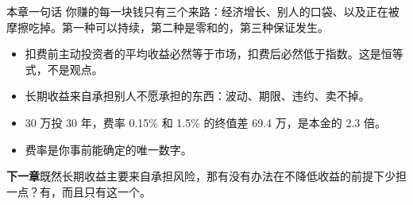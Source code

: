 \begin{takeaway}{本章一句话}
你赚的每一块钱只有三个来路：经济增长、别人的口袋、以及正在被摩擦吃掉。第一种可以持续，第二种是零和的，第三种保证发生。

\begin{itemize}
  \item 扣费前主动投资者的平均收益必然等于市场，扣费后必然低于指数。这是恒等式，不是观点。
  \item 长期收益来自承担别人不愿承担的东西：波动、期限、违约、卖不掉。
  \item 30 万投 30 年，费率 0.15\% 和 1.5\% 的终值差 69.4 万，是本金的 2.3 倍。
  \item 费率是你事前能确定的唯一数字。
\end{itemize}

\end{takeaway}

\begin{bridgebox}
\textbf{下一章}既然长期收益主要来自承担风险，那有没有办法在不降低收益的前提下少担一点？有，而且只有这一个。
\end{bridgebox}

